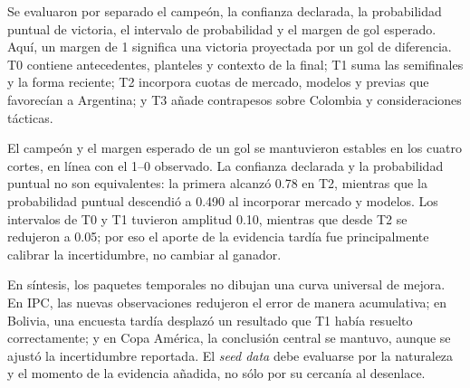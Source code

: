 ﻿\documentclass{article}
\begin{document}
Se evaluaron por separado el campeón, la confianza declarada, la probabilidad puntual de victoria, el intervalo de probabilidad y el margen de gol esperado. Aquí, un margen de 1 significa una victoria proyectada por un gol de diferencia. T0 contiene antecedentes, planteles y contexto de la final; T1 suma las semifinales y la forma reciente; T2 incorpora cuotas de mercado, modelos y previas que favorecían a Argentina; y T3 añade contrapesos sobre Colombia y consideraciones tácticas.

\begin{table}[H]
    \centering
    \small
    \caption{Salida deportiva por corte temporal; la final fue Argentina 1--0 Colombia.}
    \label{tab:seed_copa}
\end{table}

El campeón y el margen esperado de un gol se mantuvieron estables en los cuatro cortes, en línea con el 1--0 observado. La confianza declarada y la probabilidad puntual no son equivalentes: la primera alcanzó 0.78 en T2, mientras que la probabilidad puntual descendió a 0.490 al incorporar mercado y modelos. Los intervalos de T0 y T1 tuvieron amplitud 0.10, mientras que desde T2 se redujeron a 0.05; por eso el aporte de la evidencia tardía fue principalmente calibrar la incertidumbre, no cambiar al ganador.

En síntesis, los paquetes temporales no dibujan una curva universal de mejora. En IPC, las nuevas observaciones redujeron el error de manera acumulativa; en Bolivia, una encuesta tardía desplazó un resultado que T1 había resuelto correctamente; y en Copa América, la conclusión central se mantuvo, aunque se ajustó la incertidumbre reportada. El \textit{seed data} debe evaluarse por la naturaleza y el momento de la evidencia añadida, no sólo por su cercanía al desenlace.
\end{document}
